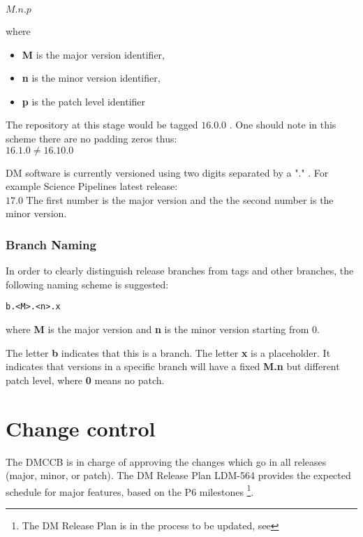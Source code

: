 $M.n.p$

where 

\begin{itemize}
\item \textbf{M} is the major version identifier,
\item \textbf{n} is the minor version identifier,
\item \textbf{p} is the patch level identifier
\end{itemize}

The repository at this stage would be tagged $16.0.0$ .
One should note in this scheme there are no padding zeros thus:
\\
$16.1.0   \neq 16.10.0$

DM software is currently versioned using two digits separated by a "." .
For example Science Pipelines latest release:\\
$17.0$
The first number is the major version and the the second number is the minor version.


\subsubsection{Branch Naming} \label{sec:branchnaming}

In order to clearly distinguish release branches from tags and other branches, the following naming scheme is suggested:

\begin{verbatim}
b.<M>.<n>.x
\end{verbatim}

where \textbf{M} is the major version and \textbf{n} is the minor version starting from 0.

The letter  \textbf{b} indicates that this is a branch.
The letter \textbf{x} is a placeholder. It indicates that versions in a specific branch will have a fixed \textbf{M.n} but different patch level, where \textbf{0} means no patch.


\newpage
\section{Change control} \label{sec:changecontrol}

The DMCCB is in charge of approving the changes which go in  all releases (major, minor, or patch).
The DM Release Plan LDM-564 provides the expected schedule for major features, based on the P6 milestones \footnote{The DM Release Plan is in the process to be updated, see }.

